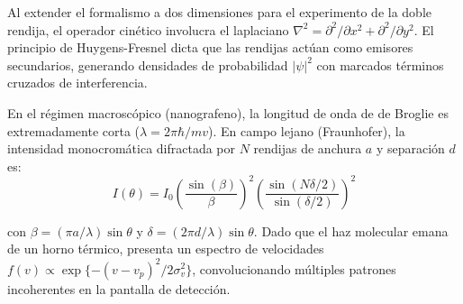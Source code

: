 Al extender el formalismo a dos dimensiones para el experimento de la doble rendija, el operador cinético involucra el laplaciano $\nabla^2 = \partial^2/\partial x^2 + \partial^2/\partial y^2$. El principio de Huygens-Fresnel dicta que las rendijas actúan como emisores secundarios, generando densidades de probabilidad $|\psi|^2$ con marcados términos cruzados de interferencia.

En el régimen macroscópico (nanografeno), la longitud de onda de de Broglie es extremadamente corta ($\lambda = 2\pi\hbar/mv$). En campo lejano (Fraunhofer), la intensidad monocromática difractada por $N$ rendijas de anchura $a$ y separación $d$ es:
\begin{equation}
    I(\theta) = I_0 \left( \frac{\sin(\beta)}{\beta} \right)^2 \left( \frac{\sin(N\delta/2)}{\sin(\delta/2)} \right)^2
\end{equation}

con $\beta = (\pi a / \lambda)\sin\theta$ y $\delta = (2\pi d / \lambda)\sin\theta$. Dado que el haz molecular emana de un horno térmico, presenta un espectro de velocidades $f(v) \propto \exp\{-(v - v_p)^2 / 2\sigma_v^2\}$, convolucionando múltiples patrones incoherentes en la pantalla de detección.